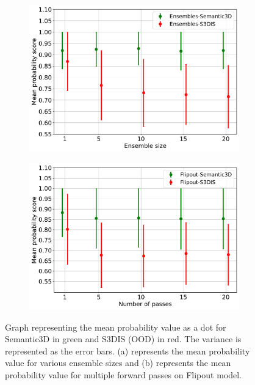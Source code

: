     \begin{figure}[!ht]
        \begin{subfigure}{0.98\textwidth}
            \centering
        \includegraphics[scale=0.5]{images/MSP/Ensembles_MSP_semvs3d.pdf}
        \caption{}
        \label{fig:msp_ensembles}
        \end{subfigure}
        \begin{subfigure}{0.98\textwidth}
            \centering
        \includegraphics[scale=0.5]{images/MSP/Flipout_MSP_semvs3d.pdf}
        \caption{}
        \label{fig:msp_flipout}
        \end{subfigure}
        \caption{Graph representing the mean probability value as a dot for Semantic3D in green and S3DIS (OOD) in red. The variance is represented as the error bars.  (a) represents the mean probability value for various ensemble sizes and (b) represents the mean probability value for multiple forward passes on Flipout model.}
    \end{figure}

